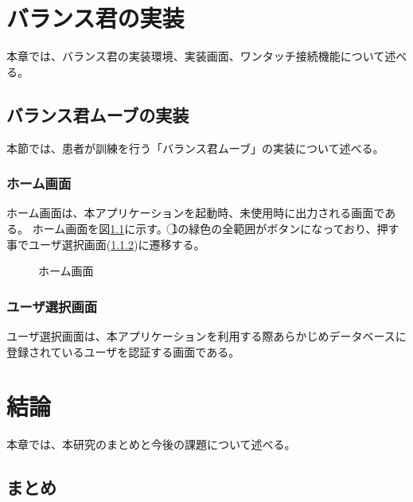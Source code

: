 \documentclass[uplatex,a4paper,12pt]{jsreport}
\begin{document}

\chapter{バランス君の実装}\label{chap:jisso}
本章では、バランス君の実装環境、実装画面、ワンタッチ接続機能について述べる。

\section{バランス君ムーブの実装}\label{sec:rihabiri_jisso}
本節では、患者が訓練を行う「バランス君ムーブ」の実装について述べる。

\subsection{ホーム画面}\label{sec:home}
ホーム画面は、本アプリケーションを起動時、未使用時に出力される画面である。
ホーム画面を図\ref{fig:p_home}に示す。
\textcircled{\scriptsize 1}の緑色の全範囲がボタンになっており、押す事でユーザ選択画面(\ref{sec:all})に遷移する。
	
\begin{figure}[htbp]
  \centering %
  \fbox{
%
%
%
  }
  \caption{ホーム画面}\label{fig:p_home}
\end{figure}

\subsection{ユーザ選択画面}\label{sec:all}
ユーザ選択画面は、本アプリケーションを利用する際あらかじめデータベースに登録されているユーザを認証する画面である。


\chapter{結論}\label{chap:keturon}
本章では、本研究のまとめと今後の課題について述べる。

\section{まとめ}\label{sec:matome}
 
\end{document}
